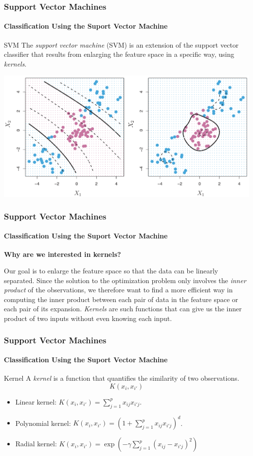 \documentclass{beamer}
\begin{document}
\begin{frame}
    \frametitle{Support Vector Machines}
    \framesubtitle{Classification Using the Suport Vector Machine}
    \begin{block}{SVM}
        The \textit{support vector machine} (SVM) is an extension of 
        the support vector classifier that results from enlarging the 
        feature space in a specific way, using \textit{kernels}.
    \end{block}
    
    \begin{center}
        \includegraphics[scale=0.2]{images/kernel.png}
    \end{center}
\end{frame}



\begin{frame}
    \frametitle{Support Vector Machines}
    \framesubtitle{Classification Using the Suport Vector Machine}
    \textbf{Why are we interested in kernels?}
    \bigskip

    Our goal is to enlarge the feature space so that the data can be linearly separated. 
    Since the solution to the optimization problem only involves the \textit{inner product} of 
    the observations, we therefore want to find a more efficient way in computing the inner 
    product between each pair of data in the feature space or each pair of its expansion. 
    \textit{Kernels} are such functions that can give us the inner product of two inputs without even 
    knowing each input.
\end{frame}


\begin{frame}
    \frametitle{Support Vector Machines}
    \framesubtitle{Classification Using the Suport Vector Machine}
    \begin{block}{Kernel}
        A \textit{kernel} is a function that quantifies the similarity of two 
        observations.
        \[K(x_i,x_{i'}) \] 
        \begin{itemize}
            \item Linear kernel: $K(x_i,x_{i'})=\sum_{j=1}^{p}x_{ij}x_{i'j}$.
            \item Polynomial kernel: $K(x_i,x_{i'})=(1+\sum_{j=1}^{p}x_{ij}x_{i'j})^d$.
            \item Radial kernel: $K(x_i,x_{i'})=\exp(-\gamma\sum_{j=1}^p(x_{ij}-x_{i'j})^2)$
        \end{itemize}
    \end{block}
\end{frame}
\end{document}
